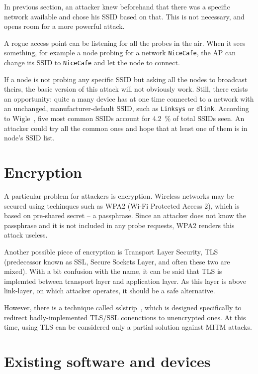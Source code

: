 \documentclass[12pt,a4paper,oneside,pdftex]{report}
\begin{document}
In previous section, an attacker knew beforehand that there was a specific network available and chose his SSID based on that. This is not necessary, and opens room for a more powerful attack.

A rogue access point can be listening for all the probes in the air. When it sees something, for example a node probing for a network \texttt{NiceCafe}, the AP can change its SSID to \texttt{NiceCafe} and let the node to connect.

If a node is not probing any specific SSID but asking all the nodes to broadcast theirs, the basic version of this attack will not obviously work. Still, there exists an opportunity: quite a many device has at one time connected to a network with an unchanged, manufacturer-default SSID, such as \texttt{Linksys} or \texttt{dlink}. According to Wigle~\cite{wigle}, five most common SSIDs account for 4.2~\% of total SSIDs seen. An attacker could try all the common ones and hope that at least one of them is in node's SSID list.

\section{Encryption}

A particular problem for attackers is encryption. Wireless networks may be secured using techinques such as WPA2 (Wi-Fi Protected Access 2), which is based on pre-shared secret -- a passphrase. Since an attacker does not know the passphrase and it is not included in any probe requests, WPA2 renders this attack useless.

Another possible piece of encryption is Transport Layer Security, TLS (predecessor known as SSL, Secure Sockets Layer, and often these two are mixed). With a bit confusion with the name, it can be said that TLS is implemted between transport layer and application layer. As this layer is above link-layer, on which attacker operates, it should be a safe alternative.

However, there is a technique called sslstrip~\cite{marlinspike2009new}, which is designed specifically to redirect badly-implemented TLS/SSL conenctions to unencrypted ones. At this time, using TLS can be considered only a partial solution against MITM attacks.

\section{Existing software and devices}
\end{document}
